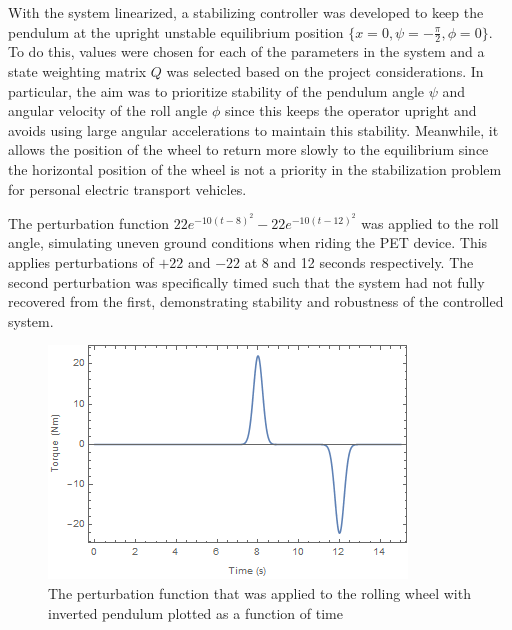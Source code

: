 With the system linearized, a stabilizing controller was developed to keep the pendulum at the upright unstable equilibrium position $\{x=0,\psi=-\frac{\pi}{2},\phi=0\}$. 
To do this, values were chosen for each of the parameters in the system and a state weighting matrix $Q$ was selected based on the project considerations. 
In particular, the aim was to prioritize stability of the pendulum angle $\psi$ and angular velocity of the roll angle $\phi$ since this keeps the operator upright and avoids using large angular accelerations to maintain this stability. 
Meanwhile, it allows the position of the wheel to return more slowly to the equilibrium since the horizontal position of the wheel is not a priority in the stabilization problem for personal electric transport vehicles.

The perturbation function $22 e^{-10 (t-8)^2}-22 e^{-10 (t-12)^2}$ was applied to the roll angle, simulating uneven ground conditions when riding the PET device. 
This applies perturbations of $+22$ and $-22$ at 8 and 12 seconds respectively. The second perturbation was specifically timed such that the system had not fully recovered from the first, demonstrating stability and robustness of the controlled system.
\par

\begin{figure}[!htb]
	\centering
	\includegraphics[width=\linewidth]{perturbation.png}
	\endminipage\hspace{1em}%
	\caption{The perturbation function that was applied to the rolling wheel with inverted pendulum plotted as a function of time}\label{fig:perturb}
\end{figure}

